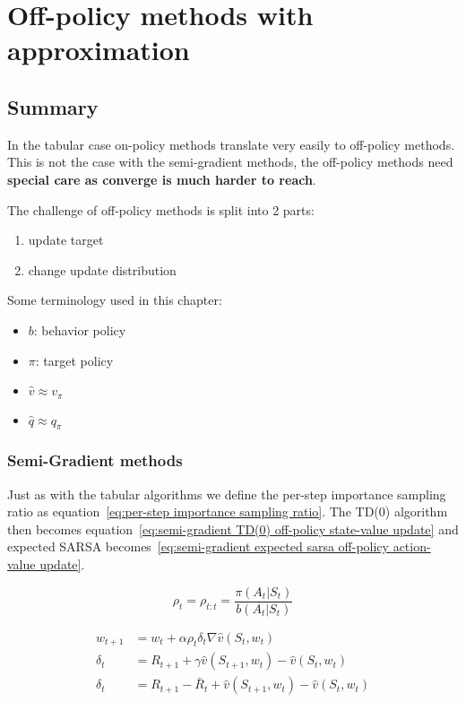 \chapter{Off-policy methods with approximation}

\section{Summary}

In the tabular case on-policy methods translate very easily to off-policy methods. This is not the case with the semi-gradient methods, the off-policy methods need \textbf{special care as converge is much harder to reach}.

The challenge of off-policy methods is split into 2 parts:
\begin{enumerate}
	\item update target
	\item change update distribution
\end{enumerate}

Some terminology used in this chapter:
\begin{itemize}
	\item $b$: behavior policy
	\item $\pi$: target policy
	\item $\hat{v} \approx v_{\pi}$
	\item $\hat{q} \approx q_{\pi}$
\end{itemize}

\subsection{Semi-Gradient methods}
Just as with the tabular algorithms we define the per-step importance sampling ratio as equation~\ref{eq:per-step importance sampling ratio}. The TD(0) algorithm then becomes equation~\ref{eq:semi-gradient TD(0) off-policy state-value update} and expected SARSA becomes~\ref{eq:semi-gradient expected sarsa off-policy action-value update}. 

\begin{equation}
\rho_t = \rho_{t:t} = \frac{\pi(A_t|S_t)}{b(A_t|S_t)}
\label{eq:per-step importance sampling ratio}
\end{equation}

\begin{equation}
\begin{split}
w_{t+1} & = w_t + \alpha \rho_t \delta_t \nabla \hat{v}(S_t, w_t) \\
\delta_t & = R_{t+1} + \gamma \hat{v}(S_{t+1}, w_t) - \hat{v}(S_t, w_t) \\
\delta_t & = R_{t+1} - \bar{R}_t + \hat{v}(S_{t+1}, w_t) - \hat{v}(S_t, w_t) \\
\end{split}
\label{eq:semi-gradient TD(0) off-policy state-value update}
\end{equation}

